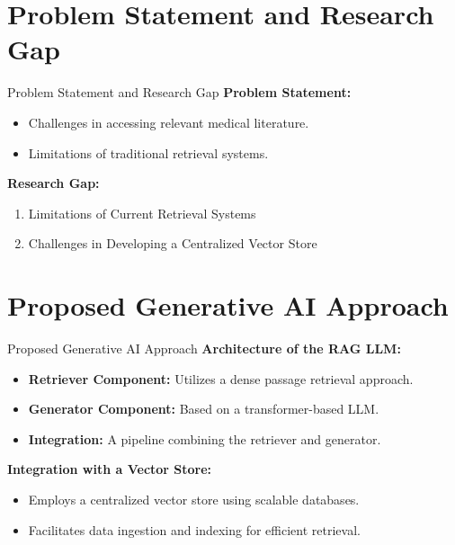 \documentclass{beamer}
\begin{document}
\section{Problem Statement and Research Gap}
\begin{frame}{Problem Statement and Research Gap}
  \textbf{Problem Statement:}
  \begin{itemize}
    \item Challenges in accessing relevant medical literature.
    \item Limitations of traditional retrieval systems.
  \end{itemize}
  \textbf{Research Gap:}
  \begin{enumerate}
    \item Limitations of Current Retrieval Systems
    \item Challenges in Developing a Centralized Vector Store
  \end{enumerate}
\end{frame}

\section{Proposed Generative AI Approach}
\begin{frame}{Proposed Generative AI Approach}
  \textbf{Architecture of the RAG LLM:}
  \begin{itemize}
    \item \textbf{Retriever Component:} Utilizes a dense passage retrieval approach.
    \item \textbf{Generator Component:} Based on a transformer-based LLM.
    \item \textbf{Integration:} A pipeline combining the retriever and generator.
  \end{itemize}
  \textbf{Integration with a Vector Store:}
  \begin{itemize}
    \item Employs a centralized vector store using scalable databases.
    \item Facilitates data ingestion and indexing for efficient retrieval.
  \end{itemize}
\end{frame}
\end{document}
